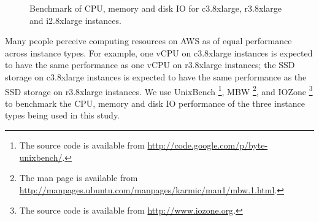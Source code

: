 \begin{figure}[t!]
\centering
\vspace{-10pt}
 \hspace{5pt}
  \hspace{5pt}
  \caption{Benchmark of CPU, memory and disk IO for c3.8xlarge, r3.8xlarge and i2.8xlarge instances.} 
  \label{fig:instance_benchmark} 
\end{figure}


Many people perceive computing resources on AWS as of equal performance across instance types. For example, one vCPU on c3.8xlarge instances is expected to have the same performance as one vCPU on r3.8xlarge instances; the SSD storage on c3.8xlarge instances is expected to have the same performance as the SSD storage on r3.8xlarge instances. We use UnixBench \footnote{The source code is available from \url{http://code.google.com/p/byte-unixbench/}.}, MBW \footnote{The man page is available from \url{http://manpages.ubuntu.com/manpages/karmic/man1/mbw.1.html}.}, and IOZone \footnote{The source code is available from \url{http://www.iozone.org}.} to benchmark the CPU, memory and disk IO performance of the three instance types being used in this study. 

